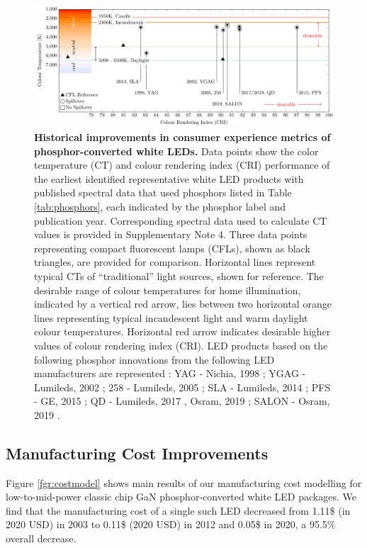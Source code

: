 \documentclass[parskip=full]{article}
\begin{document}
\begin{figure}[h!]
 \centering
 \includegraphics[width=\textwidth]{figures/breakthroughs_consumer-experience.pdf}
 \caption{\textbf{Historical improvements in consumer experience metrics of phosphor-converted white LEDs.} Data points show the color temperature (CT) and colour rendering index (CRI) performance of the earliest identified representative white LED products with published spectral data that used phosphors listed in Table \ref{tab:phosphors}, each indicated by the phosphor label and publication year. Corresponding spectral data used to calculate CT values is provided in Supplementary Note 4. Three data points representing compact fluorescent lamps (CFLs)\cite{cie_reference}, shown as black triangles, are provided for comparison. Horizontal lines represent typical CTs of “traditional” light sources, shown for reference. The desirable range of colour temperatures for home illumination, indicated by a vertical red arrow, lies between two horizontal orange lines representing typical incandescent light and warm daylight colour temperatures. Horizontal red arrow indicates desirable higher values of colour rendering index (CRI). LED products based on the following phosphor innovations from the following LED manufacturers are represented : YAG - Nichia, 1998 \cite{bando1998development}; YGAG - Lumileds, 2002 \cite{Mueller2002}; 258 - Lumileds, 2005 \cite{MuellerMach2005}; SLA - Lumileds, 2014 \cite{Pust2014}; PFS - GE, 2015 \cite{Murphy2015}; QD - Lumileds, 2017 \cite{lumileds2016qd}, Osram, 2019 \cite{osram2019qd}; SALON - Osram, 2019 \cite{Hoerder2019}.}
 \label{fgr:consumer_experience}
\end{figure}

\subsection{Manufacturing Cost Improvements}

Figure \ref{fgr:costmodel} shows main results of our manufacturing cost modelling for low-to-mid-power classic chip GaN phosphor-converted white LED packages. We find that the manufacturing cost of a single such LED decreased from 1.11\$ (in 2020 USD) in 2003 to 0.11\$ (2020 USD) in 2012 and 0.05\$ in 2020, a 95.5\% overall decrease.
\end{document}
